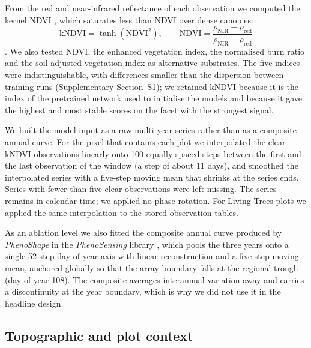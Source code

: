 \documentclass[preprint,12pt]{elsarticle}
\begin{document}
From the red and near-infrared reflectance of each observation we computed the kernel
NDVI \citep{campsvalls2021kndvi}, which saturates less than NDVI over dense canopies:
\begin{equation*}
\mathrm{kNDVI} = \tanh\!\left(\mathrm{NDVI}^2\right), \qquad
\mathrm{NDVI} = \frac{\rho_\mathrm{NIR} - \rho_\mathrm{red}}{\rho_\mathrm{NIR} + \rho_\mathrm{red}}
\end{equation*}
\citep{tucker1979red}. We also tested NDVI, the enhanced vegetation index, the normalised
burn ratio and the soil-adjusted vegetation index as alternative substrates. The five
indices were indistinguishable, with differences smaller than the dispersion between
training runs (Supplementary Section~S1); we retained kNDVI because it is the index of the
pretrained network used to initialise the models and because it gave the highest and most
stable scores on the facet with the strongest signal.

We built the model input as a raw multi-year series rather than as a composite annual
curve. For the pixel that contains each plot we interpolated the clear kNDVI observations
linearly onto 100 equally spaced steps between the first and the last observation of the
window (a step of about 11 days), and smoothed the interpolated series with a five-step
moving mean that shrinks at the series ends. Series with fewer than five clear
observations were left missing. The series remains in calendar time; we applied no phase
rotation. For Living Trees plots we applied the same interpolation to the stored
observation tables.

As an ablation level we also fitted the composite annual curve produced by
\emph{PhenoShape} in the \emph{PhenoSensing} library \citep{lopatin_phenosensing}, which
pools the three years onto a single 52-step day-of-year axis with linear reconstruction and
a five-step moving mean, anchored globally so that the array boundary falls at the regional
trough (day of year 108). The composite averages interannual variation away and carries a
discontinuity at the year boundary, which is why we did not use it in the headline design.

\subsection{Topographic and plot context}
\label{sec:context}
\end{document}
